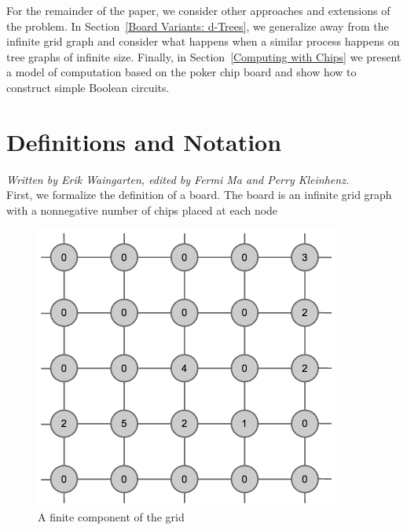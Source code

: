 \documentclass[runningheads,a4paper]{llncs}
\begin{document}
For the remainder of the paper, we consider other approaches and extensions of the problem. 
In Section~\ref{Board Variants: d-Trees}, we generalize away from the infinite grid graph and consider what happens when a similar process happens on tree graphs of infinite size. 
Finally, in Section~\ref{Computing with Chips} we present a model of computation based on the poker chip board and show how to construct simple Boolean circuits.
\section{Definitions and Notation}
\label{Definitions and Notation}

\emph{Written by Erik Waingarten, edited by Fermi Ma and Perry Kleinhenz.}\\

First, we formalize the definition of a board. The board is an infinite grid graph with a nonnegative number of chips placed at each node
\begin{figure}
\begin{center}
\includegraphics[scale=0.5]{grid1.png}
\end{center}
\caption{A finite component of the grid}
\end{figure}
\end{document}
